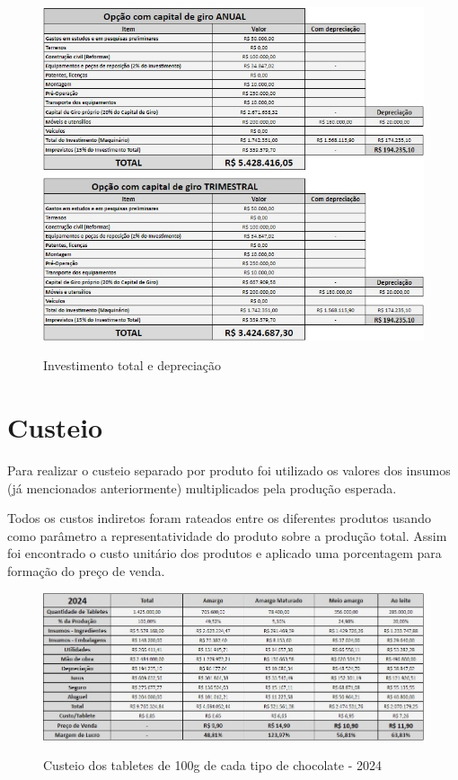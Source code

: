 \documentclass[
	12pt,				%
	openright,			%
	oneside,			%
	a4paper,			%
	english,			%
	french,				%
	spanish,			%
	brazil				%
	]{abntex2}
\begin{document}
\begin{figure}[H]
\begin{center}
\caption{Investimento total e depreciação}
\includegraphics[scale=0.7]{a1.jpeg} 
\label{-}
\end{center}
\end{figure}

\section{Custeio}

Para realizar o custeio separado por produto foi utilizado os valores dos insumos (já mencionados anteriormente) multiplicados pela produção esperada.

Todos os custos indiretos foram rateados entre os diferentes produtos usando como parâmetro a representatividade do produto sobre a produção total. Assim foi encontrado o custo unitário dos produtos e aplicado uma porcentagem para formação do preço de venda. 

\begin{figure}[H]
\begin{center}
\caption{Custeio dos tabletes de 100g de cada tipo de chocolate - 2024}
\includegraphics[scale=0.4]{a2.jpeg} 
\label{-}
\end{center}
\end{figure}
\end{document}
